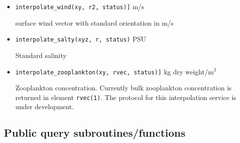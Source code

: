 \begin{itemize}
  \item {\tt interpolate\_wind(xy, r2, status)]} m/s \newline

    surface wind vector with standard orientation in m/s
 
  \item {\tt interpolate\_salty(xyz, r, status)} PSU   \newline  

    Standard salinity

  \item {\tt interpolate\_zooplankton(xy, rvec, status)]} kg dry weight/m$^3$ \newline

    Zooplankton concentration. Currently bulk zooplankton concentration
    is returned in element {\tt rvec(1)}. The protocol for this interpolation service
    is under development.



\end{itemize}



\subsection{Public query subroutines/functions}

